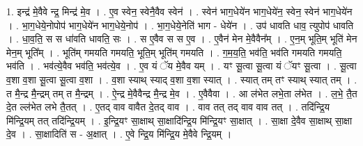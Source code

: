 \documentclass[17pt]{extarticle}
\begin{document}
1. इन्द्र॑ मे॒वैवे न्द्र॒ मिन्द्र॑ मे॒व । . ए॒व स्वेन॒ स्वेनै॒वैव स्वेन॑ । . स्वेन॑ भाग॒धेये॑न भाग॒धेये॑न॒ स्वेन॒ स्वेन॑ भाग॒धेये॑न । . भा॒ग॒धेये॒नोपोप॑ भाग॒धेये॑न भाग॒धेये॒नोप॑ । . भा॒ग॒धेये॒नेति॑ भाग - धेये॑न । . उप॑ धावति धाव॒ त्युपोप॑ धावति । . धा॒व॒ति॒ स स धा॑वति धावति॒ सः । . स ए॒वैव स स ए॒व । . ए॒वैन॑ मेन मे॒वैवैन᳚म् । . ए॒न॒म् भूति॒म् भूति॑ मेन मेन॒म् भूति᳚म् । . भूति॑म् गमयति गमयति॒ भूति॒म् भूति॑म् गमयति । . ग॒म॒य॒ति॒ भव॑ति॒ भव॑ति गमयति गमयति॒ भव॑ति । . भव॑त्ये॒वैव भव॑ति॒ भव॑त्ये॒व । . ए॒व यं ॅय मे॒वैव यम् । . यꣳ सू॒त्वा सू॒त्वा यं ॅयꣳ सू॒त्वा । . सू॒त्वा व॒शा व॒शा सू॒त्वा सू॒त्वा व॒शा । . व॒शा स्याथ् स्याद् व॒शा व॒शा स्यात् । . स्यात् तम् तꣳ स्याथ् स्यात् तम् । . त मै॒न्द्र मै॒न्द्रम् तम् त मै॒न्द्रम् । . ऐ॒न्द्र मे॒वैवैन्द्र मै॒न्द्र मे॒व । . ए॒वैवैवा । . आ ल॑भेत लभे॒ता ल॑भेत । . ल॒भे॒ तै॒त दे॒त ल्ल॑भेत लभे तै॒तत् । . ए॒तद् वाव वावैत दे॒तद् वाव । . वाव तत् तद् वाव वाव तत् । . तदि॑न्द्रि॒य मि॑न्द्रि॒यम् तत् तदि॑न्द्रि॒यम् । . इ॒न्द्रि॒यꣳ सा॒क्षाथ् सा॒क्षादि॑न्द्रि॒य मि॑न्द्रि॒यꣳ सा॒क्षात् । . सा॒क्षा दे॒वैव सा॒क्षाथ् सा॒क्षा दे॒व । . सा॒क्षादिति॑ स - अ॒क्षात् । . ए॒वे न्द्रि॒य मि॑न्द्रि॒य मे॒वैवे न्द्रि॒यम् । \newline
\end{document}
